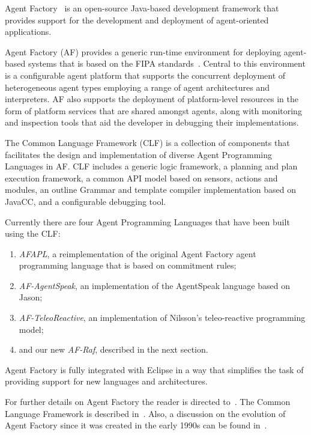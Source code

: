 \documentclass[preprint]{sigplanconf} %
\theoremstyle{remark}
\begin{document}
Agent Factory~\cite{collier2002agent} is an open-source Java-based
development framework that provides support for the development and
deployment of agent-oriented applications.

Agent Factory (AF) provides a generic run-time environment for deploying
agent-based systems that is based on the FIPA standards~\cite{poslad2000fipa}.
Central to this environment is a configurable agent platform that supports the
concurrent deployment of heterogeneous agent types employing a range of agent
architectures and interpreters. AF also supports the deployment of
platform-level resources in the form of platform services that are shared
amongst agents, along with monitoring and inspection tools that aid the
developer in debugging their implementations. 

The Common Language Framework (CLF) is a collection of components that
facilitates the design and implementation of diverse Agent Programming
Languages in AF. CLF includes a generic logic framework, a planning and
plan execution framework, a common API model based on sensors, actions and
modules, an outline Grammar and template compiler implementation based on
JavaCC, and a configurable debugging tool.

Currently there are four Agent Programming Languages that have been built
using the CLF: 
\begin{enumerate}

\item \textit{AFAPL}, a reimplementation of the original Agent Factory
agent programming language that is based on commitment rules;

\item \textit{AF-AgentSpeak}, an implementation of the AgentSpeak language based on Jason;

\item \textit{AF-TeleoReactive}, an implementation of Nilsson's teleo-reactive
programming model; 

\item and our new \textit{AF-Raf}, described in the next section.
\end{enumerate}

Agent Factory is fully integrated with Eclipse in a way that simplifies
the task of providing support for new languages and architectures.

For further details on Agent Factory the reader is directed
to~\cite{collier2009modeling}. The Common Language Framework is described
in~\cite{russell2011af}. Also, a discussion on the evolution of Agent Factory since it
was created in the early 1990s can be found in~\cite{muldoon2009towards}.
\end{document}
